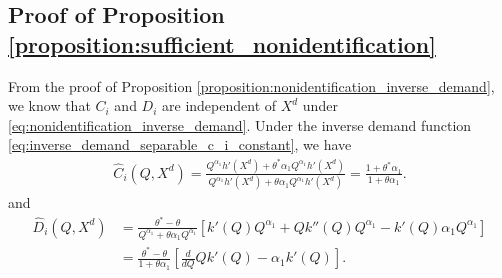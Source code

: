 \documentclass[11pt, a4paper]{article}
\theoremstyle{remark}
\begin{document}



\subsection{Proof of Proposition \ref{proposition:sufficient_nonidentification}}

From the proof of Proposition \ref{proposition:nonidentification_inverse_demand}, we know that $C_i$ and $D_i$ are independent of $X^{d}$ under \eqref{eq:nonidentification_inverse_demand}.
Under the inverse demand function \eqref{eq:inverse_demand_separable_c_i_constant}, we have
\begin{align}
    \hat{C}_i(Q, X^{d}) = \frac{Q^{\alpha_1}h'(X^{d}) + \theta^{*}\alpha_1Q^{\alpha_1}h'(X^{d})}{Q^{\alpha_1}h'(X^{d}) + \theta \alpha_1 Q^{\alpha_1}h'(X^{d})} = \frac{1 + \theta^{*}\alpha_1}{1 + \theta\alpha_1}.
\end{align}
and
\begin{align}
    \hat{D}_i(Q, X^{d}) & = \frac{\theta^{*} - \theta}{Q^{\alpha_1} + \theta \alpha_1Q^{\alpha_1}} \left[ k'(Q)Q^{\alpha_1} + Qk''(Q) Q^{\alpha_1} - k'(Q)\alpha_1Q^{\alpha_1} \right]\\
    &= \frac{\theta^{*} - \theta}{1 + \theta\alpha_1} \left[\frac{d}{dQ}Qk'(Q)  -\alpha_1k'(Q) \right].
\end{align}
\end{document}
